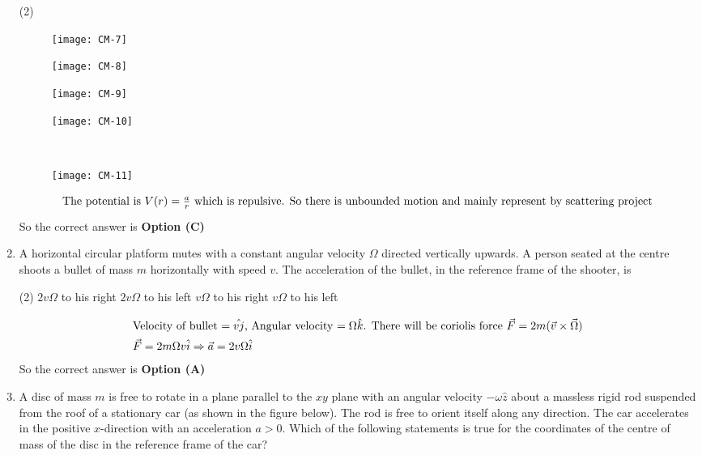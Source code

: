 \begin{enumerate}
\begin{tasks}(2)
\task[\textbf{A.}] \begin{figure}[H]
	\centering
	\texttt{[image: CM-7]}
\end{figure}
\task[\textbf{B.}] \begin{figure}[H]
	\centering
	\texttt{[image: CM-8]}
\end{figure}
\task[\textbf{C.}] \begin{figure}[H]
	\centering
	\texttt{[image: CM-9]}
\end{figure}
\task[\textbf{D.}] \begin{figure}[H]
	\centering
	\texttt{[image: CM-10]}
\end{figure}
\end{tasks}
\begin{answer}$\left. \right. $
\begin{figure}[H]
	\centering
	\texttt{[image: CM-11]}
\end{figure}
\begin{align*}
\intertext{The potential is $V(r)=\frac{a}{r}$ which is repulsive. So there is unbounded motion and mainly represent by scattering project}
\end{align*}
So the correct answer is \textbf{Option (C)}
\end{answer}
	\item A horizontal circular platform mutes with a constant angular velocity $\Omega$ directed vertically upwards. A person seated at the centre shoots a bullet of mass $m$ horizontally with speed $v$. The acceleration of the bullet, in the reference frame of the shooter, is

\begin{tasks}(2)
\task[\textbf{A.}]  $2 v \Omega$ to his right
\task[\textbf{B.}] $2 v \Omega$ to his left
\task[\textbf{C.}] $v \Omega$ to his right
\task[\textbf{D.}] $v \Omega$ to his left
\end{tasks}
\begin{answer}
\begin{align*}
\intertext{Velocity of bullet $=\hat{v j}$, Angular velocity $=\Omega \hat{k}$. There will be coriolis force $\vec{F}=2 m(\vec{v} \times \vec{\Omega})$}
\vec{F}&=2 m \Omega v \hat{i} \Rightarrow \vec{a}=2 v \Omega \hat{i}
\end{align*}
So the correct answer is \textbf{Option (A)}
\end{answer}
	\item A disc of mass $m$ is free to rotate in a plane parallel to the $x y$ plane with an angular velocity $-\omega \hat{z}$ about a massless rigid rod suspended from the roof of a stationary car (as shown in the figure below). The rod is free to orient itself along any direction. The car accelerates in the positive $x$-direction with an acceleration $a>0 .$ Which of the following statements is true for the coordinates of the centre of mass of the disc in the reference frame of the car?


\end{enumerate}
